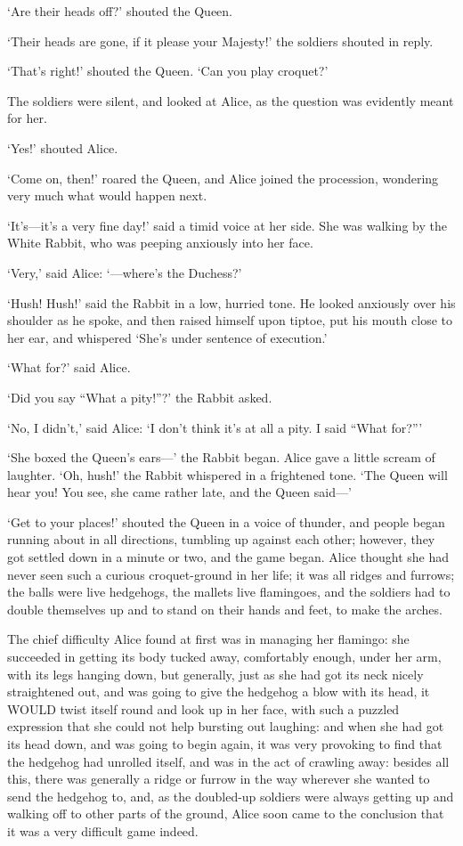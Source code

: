 \documentclass[12pt]{book}
\begin{document}
\begin{Parallel}[p]{}{}
{‘Are their heads off?’ shouted the Queen.

‘Their heads are gone, if it please your Majesty!’ the soldiers shouted in reply.

‘That’s right!’ shouted the Queen. ‘Can you play croquet?’

The soldiers were silent, and looked at Alice, as the question was evidently meant for her.

‘Yes!’ shouted Alice.

‘Come on, then!’ roared the Queen, and Alice joined the procession, wondering very much what would happen next.

‘It’s—it’s a very fine day!’ said a timid voice at her side. She was walking by the White Rabbit, who was peeping anxiously into her face.

‘Very,’ said Alice: ‘—where’s the Duchess?’

‘Hush! Hush!’ said the Rabbit in a low, hurried tone. He looked anxiously over his shoulder as he spoke, and then raised himself upon tiptoe, put his mouth close to her ear, and whispered ‘She’s under sentence of execution.’

‘What for?’ said Alice.

‘Did you say “What a pity!”?’ the Rabbit asked.

‘No, I didn’t,’ said Alice: ‘I don’t think it’s at all a pity. I said “What for?”’

‘She boxed the Queen’s ears—’ the Rabbit began. Alice gave a little scream of laughter. ‘Oh, hush!’ the Rabbit whispered in a frightened tone. ‘The Queen will hear you! You see, she came rather late, and the Queen said—’

‘Get to your places!’ shouted the Queen in a voice of thunder, and people began running about in all directions, tumbling up against each other; however, they got settled down in a minute or two, and the game began. Alice thought she had never seen such a curious croquet-ground in her life; it was all ridges and furrows; the balls were live hedgehogs, the mallets live flamingoes, and the soldiers had to double themselves up and to stand on their hands and feet, to make the arches.

The chief difficulty Alice found at first was in managing her flamingo: she succeeded in getting its body tucked away, comfortably enough, under her arm, with its legs hanging down, but generally, just as she had got its neck nicely straightened out, and was going to give the hedgehog a blow with its head, it WOULD twist itself round and look up in her face, with such a puzzled expression that she could not help bursting out laughing: and when she had got its head down, and was going to begin again, it was very provoking to find that the hedgehog had unrolled itself, and was in the act of crawling away: besides all this, there was generally a ridge or furrow in the way wherever she wanted to send the hedgehog to, and, as the doubled-up soldiers were always getting up and walking off to other parts of the ground, Alice soon came to the conclusion that it was a very difficult game indeed.

}
\end{Parallel}
\end{document}
